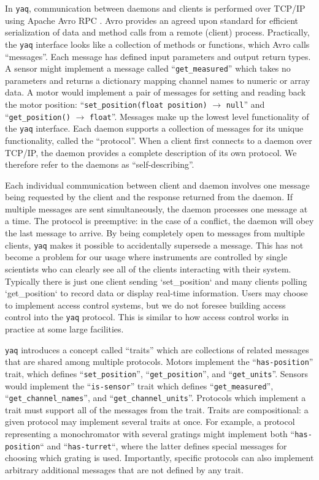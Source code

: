 \documentclass[aip, amsmath, amssymb, reprint,]{revtex4-2}
\newcommand\yaq{\texttt{yaq}}
\begin{document}
In \yaq{}, communication between daemons and clients is performed over TCP/IP using Apache Avro RPC \cite{AvroSpecification}.
Avro provides an agreed upon standard for efficient serialization of data and method calls from a remote (client) process.
Practically, the \yaq{} interface looks like a collection of methods or functions, which Avro calls ``messages''.
Each message has defined input parameters and output return types.
A sensor might implement a message called ``\texttt{get\_measured}'' which takes no parameters and returns a dictionary mapping channel names to numeric or array data.
A motor would implement a pair of messages for setting and reading back the motor position: ``\texttt{set\_position(float position)} $\rightarrow$ \texttt{null}'' and ``\texttt{get\_position()} $\rightarrow$ \texttt{float}''.
Messages make up the lowest level functionality of the \yaq{} interface.
Each daemon supports a collection of messages for its unique functionality, called the ``protocol''.
When a client first connects to a daemon over TCP/IP, the daemon provides a complete description of its own protocol.
We therefore refer to the daemons as ``self-describing''.

Each individual communication between client and daemon involves one message being requested by the client and the response returned from the daemon.
If multiple messages are sent simultaneously, the daemon processes one message at a time.
The protocol is preemptive: in the case of a conflict, the daemon will obey the last message to arrive.
By being completely open to messages from multiple clients, \yaq{} makes it possible to accidentally supersede a message.
This has not become a problem for our usage where instruments are controlled by single scientists who can clearly see all of the clients interacting with their system.
Typically there is just one client sending `set\_position` and many clients polling `get\_position` to record data or display real-time information.
Users may choose to implement access control systems, but we do not foresee building access control into the \yaq{} protocol.
This is similar to how access control works in practice at some large facilities.

\yaq{} introduces a concept called ``traits'' which are collections of related messages that are shared among multiple protocols.
Motors implement the ``\texttt{has-position}'' trait, which defines ``\texttt{set\_position}'', ``\texttt{get\_position}'', and ``\texttt{get\_units}''.
Sensors would implement the ``\texttt{is-sensor}'' trait which defines ``\texttt{get\_measured}'', ``\texttt{get\_channel\_names}'', and ``\texttt{get\_channel\_units}''.
Protocols which implement a trait must support all of the messages from the trait.
Traits are compositional: a given protocol may implement several traits at once.
For example, a protocol representing a monochromator with several gratings might implement both ``\texttt{has-position}`` and ``\texttt{has-turret}``, where the latter defines special messages for choosing which grating is used.
Importantly, specific protocols can also implement arbitrary additional messages that are not defined by any trait.
\end{document}
